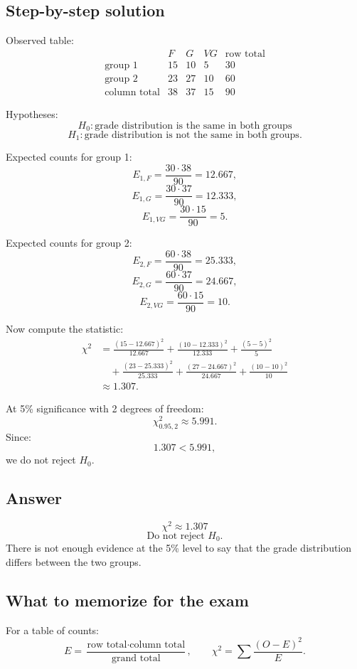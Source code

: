 \documentclass[11pt,a4paper]{article}
\begin{document}
\subsection*{Step-by-step solution}
Observed table:
\[
\begin{array}{c|ccc|c}
&F&G&VG&\text{row total}\\ \hline
\text{group 1}&15&10&5&30\\
\text{group 2}&23&27&10&60\\ \hline
\text{column total}&38&37&15&90
\end{array}
\]

Hypotheses:
\[
H_0:\text{grade distribution is the same in both groups}
\]
\[
H_1:\text{grade distribution is not the same in both groups}.
\]

Expected counts for group 1:
\[
E_{1,F}=\frac{30\cdot 38}{90}=12.667,
\]
\[
E_{1,G}=\frac{30\cdot 37}{90}=12.333,
\]
\[
E_{1,VG}=\frac{30\cdot 15}{90}=5.
\]

Expected counts for group 2:
\[
E_{2,F}=\frac{60\cdot 38}{90}=25.333,
\]
\[
E_{2,G}=\frac{60\cdot 37}{90}=24.667,
\]
\[
E_{2,VG}=\frac{60\cdot 15}{90}=10.
\]

Now compute the statistic:
\begin{align*}
\chi^2
&=\frac{(15-12.667)^2}{12.667}
+\frac{(10-12.333)^2}{12.333}
+\frac{(5-5)^2}{5}\\
&\quad+\frac{(23-25.333)^2}{25.333}
+\frac{(27-24.667)^2}{24.667}
+\frac{(10-10)^2}{10}\\
&\approx 1.307.
\end{align*}

At 5\% significance with 2 degrees of freedom:
\[
\chi^2_{0.95,2}\approx 5.991.
\]
Since:
\[
1.307<5.991,
\]
we do not reject \(H_0\).

\subsection*{Answer}
\[
\boxed{\chi^2\approx 1.307}
\]
\[
\boxed{\text{Do not reject }H_0.}
\]
There is not enough evidence at the 5\% level to say that the grade distribution differs between the two groups.

\subsection*{What to memorize for the exam}
For a table of counts:
\[
E=\frac{\text{row total}\cdot \text{column total}}{\text{grand total}},
\qquad
\chi^2=\sum\frac{(O-E)^2}{E}.
\]
\end{document}
